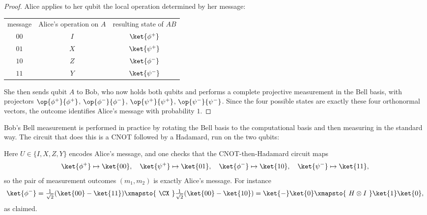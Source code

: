 \begin{proof}
	Alice applies to her qubit the local operation determined by her message:
	\begin{center}
		\begin{tabular}{c c c}
			message & Alice's operation on $A$ & resulting state of $AB$ \\[2pt]
			$00$ & $I$ & $\ket{\phi^+}$ \\
			$01$ & $X$ & $\ket{\psi^+}$ \\
			$10$ & $Z$ & $\ket{\phi^-}$ \\
			$11$ & $Y$ & $\ket{\psi^-}$
		\end{tabular}
	\end{center}
	She then sends qubit $A$ to Bob, who now holds both qubits and performs a complete projective measurement in the Bell basis, with projectors $\op{\phi^+}{\phi^+}$, $\op{\phi^-}{\phi^-}$, $\op{\psi^+}{\psi^+}$, $\op{\psi^-}{\psi^-}$. Since the four possible states are exactly these four orthonormal vectors, the outcome identifies Alice's message with probability $1$.
\end{proof}

Bob's Bell measurement is performed in practice by rotating the Bell basis to the computational basis and then measuring in the standard way. The circuit that does this is a CNOT followed by a Hadamard, run on the two qubits:

\begin{center}
\end{center}

Here $U \in \{I,X,Z,Y\}$ encodes Alice's message, and one checks that the CNOT-then-Hadamard circuit maps
$$\ket{\phi^+}\mapsto\ket{00},\quad \ket{\psi^+}\mapsto\ket{01},\quad \ket{\phi^-}\mapsto\ket{10},\quad\ket{\psi^-}\mapsto \ket{11},$$
so the pair of measurement outcomes $(m_1,m_2)$ is exactly Alice's message. For instance
$$\ket{\phi^-} = \tfrac1{\sqrt2}(\ket{00}-\ket{11}) \xmapsto{\ \CX\ } \tfrac1{\sqrt2}(\ket{00}-\ket{10}) = \ket{-}\ket{0}\xmapsto{\ H\otimes I\ }\ket{1}\ket{0},$$
as claimed.

